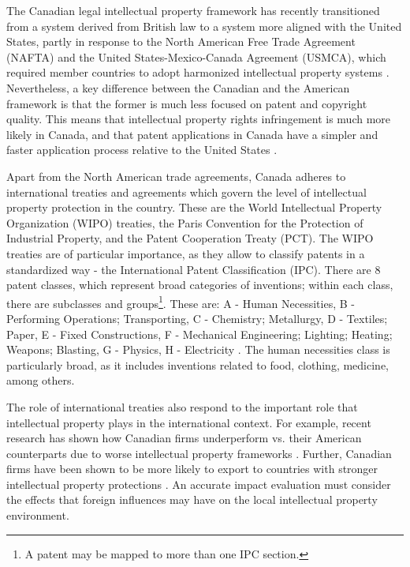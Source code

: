\documentclass[../main.tex]{subfiles}
\begin{document}



The Canadian legal intellectual property framework has recently transitioned from a system derived from British law to a system more aligned with the United States, partly in response to the North American Free Trade Agreement (NAFTA) and the United States-Mexico-Canada Agreement (USMCA), which required member countries to adopt harmonized intellectual property systems \parencite{putnam06}. Nevertheless, a key difference between the Canadian and the American framework is that the former is much less focused on patent and copyright quality. This means that intellectual property rights infringement is much more likely in Canada, and that patent applications in Canada have a simpler and faster application process relative to the United States \parencite{vaver06}. 


Apart from the North American trade agreements, Canada adheres to international treaties and agreements which govern the level of intellectual property protection in the country. These are the World Intellectual Property Organization (WIPO) treaties, the Paris Convention for the Protection of Industrial Property, and the Patent Cooperation Treaty (PCT). The WIPO treaties are of particular importance, as they allow to classify patents in a standardized way - the International Patent Classification (IPC). There are 8 patent classes, which represent broad categories of inventions; within each class, there are subclasses and groups\footnote{A patent may be mapped to more than one IPC section.}. These are: A - Human Necessities, B - Performing Operations; Transporting, C - Chemistry; Metallurgy, D - Textiles; Paper, E - Fixed Constructions, F - Mechanical Engineering; Lighting; Heating; Weapons; Blasting, G - Physics, H - Electricity \parencite{worldintellectualpropertyorganization24}. The human necessities class is particularly broad, as it includes inventions related to food, clothing, medicine, among others. 
 
The role of international treaties also respond to the important role that intellectual property plays in the international context. For example, recent research has shown how Canadian firms underperform vs. their American counterparts due to worse intellectual property frameworks \parencite{carew_etal06}. Further, Canadian firms have been shown to be more likely to export to countries with stronger intellectual property protections \parencite{rafiquzzaman02}. An accurate impact evaluation must consider the effects that foreign influences may have on the local intellectual property environment.
\end{document}
